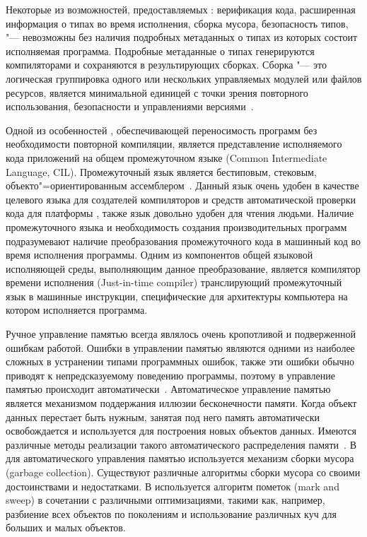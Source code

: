 Некоторые из возможностей, предоставляемых \dotnet{}: верификация кода, расширенная информация о типах во время исполнения, сборка мусора, безопасность типов, "--- невозможны без наличия подробных метаданных о типах из которых состоит исполняемая программа.
Подробные метаданные о типах генерируются компиляторами и сохраняются в результирующих сборках.
Сборка "--- это логическая группировка одного или нескольких управляемых модулей или файлов ресурсов, является минимальной единицей с точки зрения повторного использования, безопасности и управлениями версиями~\cite[с.~6]{richter_2012_en}.

Одной из особенностей \dotnet{}, обеспечивающей переносимость программ без необходимости повторной компиляции, является представление исполняемого кода приложений на общем промежуточном языке (Common Intermediate Language, CIL). 
Промежуточный язык является бестиповым, стековым, объекто"=ориентированным ассемблером~\cite[с.~16\,--\,17]{richter_2012_en}.
Данный язык очень удобен в качестве целевого языка для создателей компиляторов и средств автоматической проверки кода для платформы \dotnet{}, также язык довольно удобен для чтения людьми.
Наличие промежуточного языка и необходимость создания производительных программ подразумевают наличие преобразования промежуточного кода в машинный код во время исполнения программы.
Одним из компонентов общей языковой исполняющей среды, выполняющим данное преобразование, является компилятор времени исполнения (Just-in-time compiler) транслирующий промежуточный язык в машинные инструкции, специфические для архитектуры компьютера на котором исполняется программа.

Ручное управление памятью всегда являлось очень кропотливой и подверженной ошибкам работой.
Ошибки в управлении памятью являются одними из наиболее сложных в устранении типами программных ошибок, также эти ошибки обычно приводят к непредсказуемому поведению программы, поэтому в \dotnet{} управление памятью происходит автоматически~\cite[с.~505\,--\,506]{richter_2012_en}.
Автоматическое управление памятью является механизмом поддержания иллюзии бесконечности памяти.
Когда объект данных перестает быть нужным, занятая под него память автоматически освобождается и используется для построения новых объектов данных.
Имеются различные методы реализации такого автоматического распределения памяти~\cite[с.~489]{sicp_2006_ru}.
В~\dotnet{} для автоматического управления памятью используется механизм сборки мусора (garbage collection).
Существуют различные алгоритмы сборки мусора со своими достоинствами и недостатками. 
В \dotnet{} используется алгоритм пометок (mark and sweep) в сочетании с различными оптимизациями, такими как, например, разбиение всех объектов по поколениям и использование различных куч для больших и малых объектов.


